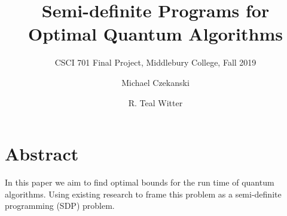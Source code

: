 \documentclass[review]{acmart}
\begin{document}
\title{Semi-definite Programs for Optimal Quantum Algorithms}

\subtitle{CSCI 701 Final Project, Middlebury College, Fall 2019}

\author{Michael Czekanski}

\author{R. Teal Witter}

\maketitle

\section*{Abstract}

In this paper we aim to find optimal bounds for the run time of quantum algorithms. Using existing research to frame this problem as a semi-definite programming (SDP) problem.










\end{document}
